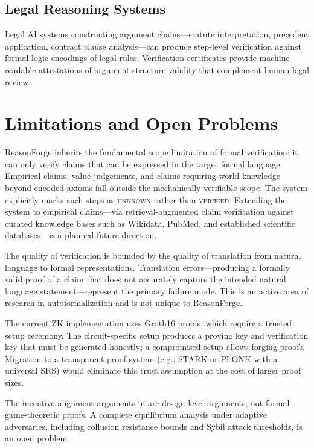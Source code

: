 \documentclass[11pt,a4paper]{article}
\begin{document}
\subsection{Legal Reasoning Systems}

Legal AI systems constructing argument chains---statute interpretation,
precedent application, contract clause analysis---can produce step-level
verification against formal logic encodings of legal rules.  Verification
certificates provide machine-readable attestations of argument structure
validity that complement human legal review.

\section{Limitations and Open Problems}
\label{sec:limitations}

ReasonForge inherits the fundamental scope limitation of formal
verification: it can only verify claims that can be expressed in the
target formal language.  Empirical claims, value judgements, and claims
requiring world knowledge beyond encoded axioms fall outside the
mechanically verifiable scope.  The system explicitly marks such steps as
\textsc{unknown} rather than \textsc{verified}.  Extending the system to
empirical claims---via retrieval-augmented claim verification against
curated knowledge bases such as Wikidata, PubMed, and established
scientific databases---is a planned future direction.

The quality of verification is bounded by the quality of translation from
natural language to formal representations.  Translation errors---producing
a formally valid proof of a claim that does not accurately capture the
intended natural language statement---represent the primary failure mode.
This is an active area of research in autoformalization and is not unique
to ReasonForge.

The current ZK implementation uses Groth16 proofs, which require a
trusted setup ceremony.  The circuit-specific setup produces a proving
key and verification key that must be generated honestly; a compromised
setup allows forging proofs.  Migration to a transparent proof system
(e.g., STARK or PLONK with a universal SRS) would eliminate this trust
assumption at the cost of larger proof sizes.

The incentive alignment arguments in  are design-level
arguments, not formal game-theoretic proofs.  A complete equilibrium
analysis under adaptive adversaries, including collusion resistance
bounds and Sybil attack thresholds, is an open problem.
\end{document}
